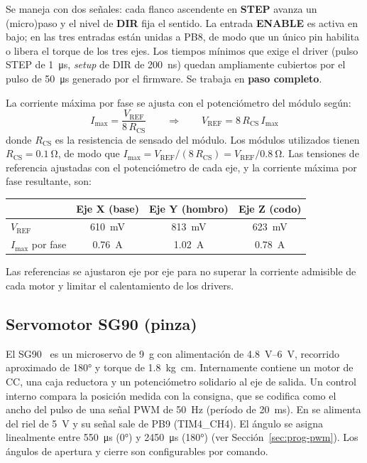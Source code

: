 Se maneja con dos señales: cada flanco ascendente en \textbf{STEP} avanza un (micro)paso y el
nivel de \textbf{DIR} fija el sentido. La entrada \textbf{ENABLE} es activa en bajo; en \tails{}
las tres entradas están unidas a PB8, de modo que un único pin habilita o libera el torque de
los tres ejes. Los tiempos mínimos que exige el driver (pulso STEP de \SI{1}{\micro\second},
\emph{setup} de DIR de \SI{200}{\nano\second}) quedan ampliamente cubiertos por el pulso de
\SI{50}{\micro\second} generado por el firmware. Se trabaja en \textbf{paso completo}.

La corriente máxima por fase se ajusta con el potenciómetro del módulo según:
\begin{equation}
  I_{\max} = \frac{V_{\mathrm{REF}}}{8\,R_{\mathrm{CS}}}
  \qquad\Rightarrow\qquad
  V_{\mathrm{REF}} = 8\,R_{\mathrm{CS}}\,I_{\max}
  \label{eq:vref}
\end{equation}
donde $R_{\mathrm{CS}}$ es la resistencia de sensado del módulo. Los módulos utilizados tienen
$R_{\mathrm{CS}}=\SI{0,1}{\ohm}$, de modo que $I_{\max}=V_{\mathrm{REF}}/(8\,R_{\mathrm{CS}})=
V_{\mathrm{REF}}/\SI{0,8}{\ohm}$. Las tensiones de referencia ajustadas con el potenciómetro de
cada eje, y la corriente máxima por fase resultante, son:
\begin{center}
\begin{tabular}{@{}lccc@{}}
\toprule
 & \textbf{Eje X (base)} & \textbf{Eje Y (hombro)} & \textbf{Eje Z (codo)}\\
\midrule
$V_{\mathrm{REF}}$       & \SI{610}{\milli\volt} & \SI{813}{\milli\volt} & \SI{623}{\milli\volt}\\
$I_{\max}$ por fase      & \SI{0,76}{\ampere}    & \SI{1,02}{\ampere}    & \SI{0,78}{\ampere}\\
\bottomrule
\end{tabular}
\end{center}
Las referencias se ajustaron eje por eje para no superar la corriente admisible de cada motor y
limitar el calentamiento de los drivers.


\subsection{Servomotor SG90 (pinza)}
El SG90~\cite{sg90} es un microservo de \SI{9}{\gram} con alimentación de
\SIrange{4,8}{6}{\volt}, recorrido aproximado de \ang{180} y torque de
\SI{1,8}{\kilo\gram\centi\meter}. Internamente contiene un motor de CC, una caja reductora y
un potenciómetro solidario al eje de salida. Un control interno compara la posición medida
con la consigna, que se codifica como el ancho del pulso de una señal PWM de
\SI{50}{\hertz} (período de \SI{20}{\milli\second}). En \tails{} se alimenta del riel de
\SI{5}{\volt} y su señal sale de PB9 (TIM4\_CH4). El ángulo se asigna linealmente entre
\SI{550}{\micro\second} (\ang{0}) y \SI{2450}{\micro\second} (\ang{180}) (ver
Sección~\ref{sec:prog-pwm}). Los ángulos de apertura y cierre son configurables por comando.

